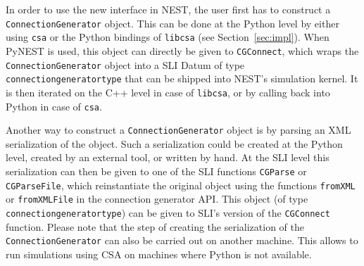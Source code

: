 \documentclass{frontiersSCNS} %
\begin{document}
In order to use the new interface in NEST, the user first has to
construct a \verb|ConnectionGenerator| object.
This can be done at the Python level by either using
\verb|csa| or the Python bindings of \verb|libcsa| (see
Section~\ref{sec:impl}). When PyNEST is used, this object can directly
be given to \verb|CGConnect|, which wraps the
\verb|ConnectionGenerator| object into a SLI Datum of type
\verb|connectiongeneratortype| that can be shipped into NEST's
simulation kernel. It is then iterated on the C++ level in case of
\verb|libcsa|, or by calling back into Python in case of \verb|csa|.

Another way to construct a \verb|ConnectionGenerator| object is by
parsing an XML serialization of the object. Such a serialization could
be created at the Python level, created by an external tool, or
written by hand.  At the SLI level
this serialization can then be given to one of the
SLI functions \verb|CGParse| or \verb|CGParseFile|, which
reinstantiate the original object using the functions \verb|fromXML| or
\verb|fromXMLFile| in the connection generator API. This object (of type
\verb|connectiongeneratortype|) can be given to SLI's version of the
\verb|CGConnect| function. Please note that the step of creating the
serialization of the \verb|ConnectionGenerator| can also be carried
out on another machine. This allows to run simulations using CSA
on machines where Python is not available.
\end{document}

